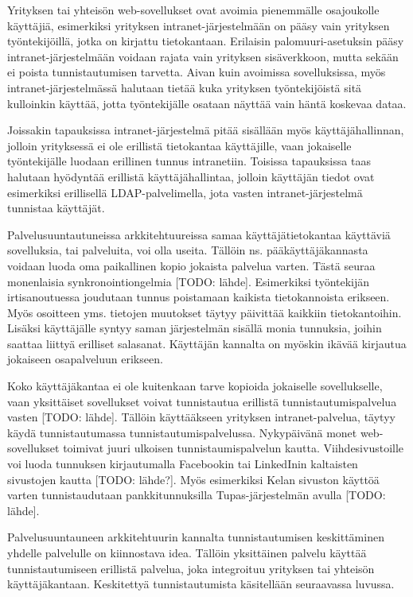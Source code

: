Yrityksen tai yhteisön web-sovellukset ovat avoimia pienemmälle osajoukolle käyttäjiä, esimerkiksi yrityksen intranet-järjestelmään on pääsy vain yrityksen työntekijöillä, jotka on kirjattu tietokantaan. Erilaisin palomuuri-asetuksin pääsy intranet-järjestelmään voidaan rajata vain yrityksen sisäverkkoon, mutta sekään ei poista tunnistautumisen tarvetta. Aivan kuin avoimissa sovelluksissa, myös intranet-järjestelmässä halutaan tietää kuka yrityksen työntekijöistä sitä kulloinkin käyttää, jotta työntekijälle osataan näyttää vain häntä koskevaa dataa.

Joissakin tapauksissa intranet-järjestelmä pitää sisällään myös käyttäjähallinnan, jolloin yrityksessä ei ole erillistä tietokantaa käyttäjille, vaan jokaiselle työntekijälle luodaan erillinen tunnus intranetiin. Toisissa tapauksissa taas halutaan hyödyntää erillistä käyttäjähallintaa, jolloin käyttäjän tiedot ovat  esimerkiksi erillisellä LDAP-palvelimella, jota vasten intranet-järjestelmä tunnistaa käyttäjät.

Palvelusuuntautuneissa arkkitehtuureissa samaa käyttäjätietokantaa käyttäviä sovelluksia, tai palveluita, voi olla useita. Tällöin ns. pääkäyttäjäkannasta voidaan luoda oma paikallinen kopio jokaista palvelua varten. Tästä seuraa monenlaisia synkronointiongelmia [TODO: lähde]. Esimerkiksi työntekijän irtisanoutuessa joudutaan tunnus poistamaan kaikista tietokannoista erikseen. Myös osoitteen yms. tietojen muutokset täytyy päivittää kaikkiin tietokantoihin. Lisäksi käyttäjälle syntyy saman järjestelmän sisällä monia tunnuksia, joihin saattaa liittyä erilliset salasanat. Käyttäjän kannalta on myöskin ikävää kirjautua jokaiseen osapalveluun erikseen.

Koko käyttäjäkantaa ei ole kuitenkaan tarve kopioida jokaiselle sovellukselle, vaan yksittäiset sovellukset voivat tunnistautua erillistä tunnistautumispalvelua vasten [TODO: lähde]. Tällöin käyttääkseen yrityksen intranet-palvelua, täytyy käydä tunnistautumassa tunnistautumispalvelussa. Nykypäivänä monet web-sovellukset toimivat juuri ulkoisen tunnistaumispalvelun kautta. Viihdesivustoille voi luoda tunnuksen kirjautumalla Facebookin tai LinkedInin kaltaisten sivustojen kautta [TODO: lähde?]. Myös esimerkiksi Kelan sivuston käyttöä varten tunnistaudutaan pankkitunnuksilla Tupas-järjestelmän avulla [TODO: lähde].

Palvelusuuntauneen arkkitehtuurin kannalta tunnistautumisen keskittäminen yhdelle palvelulle on kiinnostava idea. Tällöin yksittäinen palvelu käyttää tunnistautumiseen erillistä palvelua, joka integroituu yrityksen tai yhteisön käyttäjäkantaan. Keskitettyä tunnistautumista käsitellään seuraavassa luvussa.
